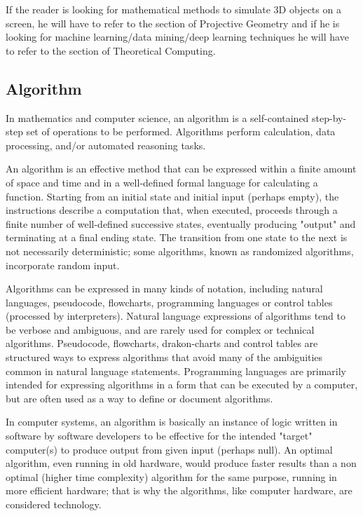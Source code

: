 	\begin{tcolorbox}[title=Remark,colframe=black,arc=10pt]
	If the reader is looking for mathematical methods to simulate 3D objects on a screen, he will have to refer to the section of Projective Geometry and if he is looking for machine learning/data mining/deep learning techniques he will have to refer to the section of Theoretical Computing.
	\end{tcolorbox}
	
	\subsection{Algorithm}
	In mathematics and computer science, an algorithm  is a self-contained step-by-step set of operations to be performed. Algorithms perform calculation, data processing, and/or automated reasoning tasks.

	An algorithm is an effective method that can be expressed within a finite amount of space and time and in a well-defined formal language for calculating a function. Starting from an initial state and initial input (perhaps empty), the instructions describe a computation that, when executed, proceeds through a finite number of well-defined successive states, eventually producing "output" and terminating at a final ending state. The transition from one state to the next is not necessarily deterministic; some algorithms, known as randomized algorithms, incorporate random input.

	Algorithms can be expressed in many kinds of notation, including natural languages, pseudocode, flowcharts, programming languages or control tables (processed by interpreters). Natural language expressions of algorithms tend to be verbose and ambiguous, and are rarely used for complex or technical algorithms. Pseudocode, flowcharts, drakon-charts and control tables are structured ways to express algorithms that avoid many of the ambiguities common in natural language statements. Programming languages are primarily intended for expressing algorithms in a form that can be executed by a computer, but are often used as a way to define or document algorithms.

	In computer systems, an algorithm is basically an instance of logic written in software by software developers to be effective for the intended "target" computer(s) to produce output from given input (perhaps null). An optimal algorithm, even running in old hardware, would produce faster results than a non optimal (higher time complexity) algorithm for the same purpose, running in more efficient hardware; that is why the algorithms, like computer hardware, are considered technology.
	
